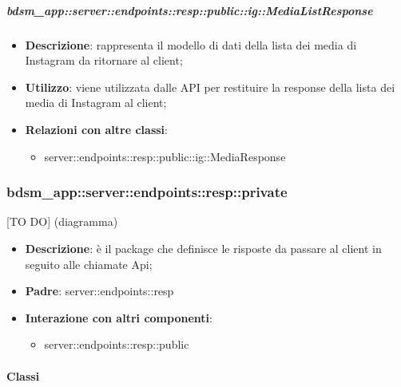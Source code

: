     \subparagraph{bdsm\_app::server::endpoints::resp::public::ig::MediaListResponse} %
    \label{subp:bdsm_app_server_endpoints_resp_public_ig_medialistresponse}
    \begin{itemize}
      \item \textbf{Descrizione}: rappresenta il modello di dati della lista dei media di Instagram da ritornare al client;
      \item \textbf{Utilizzo}: viene utilizzata dalle API per restituire la response della lista dei media di Instagram al client;
      \item \textbf{Relazioni con altre classi}:
        \begin{itemize}
          \item server::endpoints::resp::public::ig::MediaResponse
        \end{itemize}
      \end{itemize}

\subsubsection{bdsm\_app::server::endpoints::resp::private} %
\label{ssub:bdsm_app_server_endpoints_resp_private}
[TO DO] (diagramma) \newline \newline

\begin{itemize}
  \item \textbf{Descrizione}: è il package che definisce le risposte da passare al client in seguito alle chiamate Api;
  \item \textbf{Padre}: server::endpoints::resp
  \item \textbf{Interazione con altri componenti}:
  	\begin{itemize}
  		\item server::endpoints::resp::public
	\end{itemize}
\end{itemize}

	\paragraph{Classi} %

